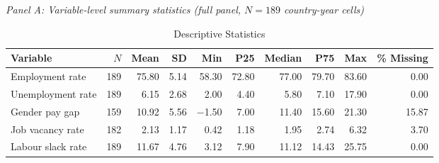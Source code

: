 \documentclass[12pt,a4paper]{article}
\begin{document}
\begin{table}[htbp]
\caption{Descriptive Statistics}
\label{tab:descriptive}
\begin{threeparttable}
\smallskip
\textit{Panel A: Variable-level summary statistics (full panel, $N=189$ country-year cells)}
\smallskip
\begin{adjustbox}{max width=\textwidth}
\begin{tabular}{lrrrrrrrrr}
\toprule
Variable & $N$ & Mean & SD & Min & P25 & Median & P75 & Max & \% Missing \\
\midrule
Employment rate & 189 & 75.80 & 5.14 & 58.30 & 72.80 & 77.00 & 79.70 & 83.60 & 0.00 \\
Unemployment rate & 189 & 6.15 & 2.68 & 2.00 & 4.40 & 5.80 & 7.10 & 17.90 & 0.00 \\
Gender pay gap & 159 & 10.92 & 5.56 & $-$1.50 & 7.00 & 11.40 & 15.60 & 21.30 & 15.87 \\
Job vacancy rate & 182 & 2.13 & 1.17 & 0.42 & 1.18 & 1.95 & 2.74 & 6.32 & 3.70 \\
Labour slack rate & 189 & 11.67 & 4.76 & 3.12 & 7.90 & 11.12 & 14.43 & 25.75 & 0.00 \\
\bottomrule
\end{tabular}
\end{adjustbox}


\end{threeparttable}
\end{table}
\end{document}
